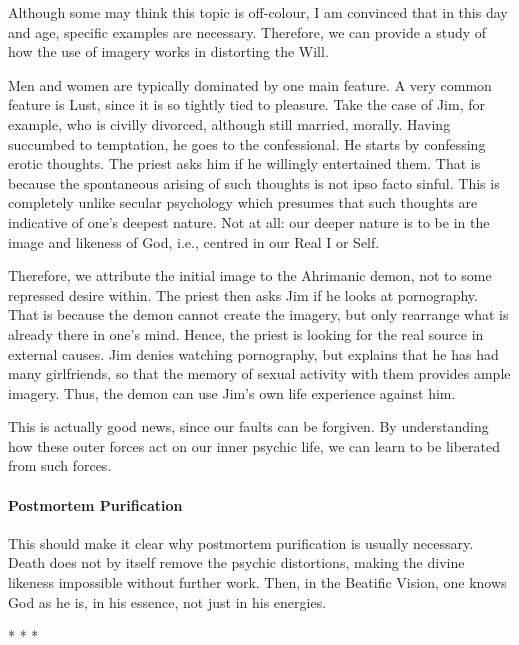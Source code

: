 Although some may think this topic is off-colour, I am convinced that in this day and age, specific examples are necessary. Therefore, we can provide a study of how the use of imagery works in distorting the Will.

Men and women are typically dominated by one main feature. A very common feature is Lust, since it is so tightly tied to pleasure. Take the case of Jim, for example, who is civilly divorced, although still married, morally. Having succumbed to temptation, he goes to the confessional. He starts by confessing erotic thoughts. The priest asks him if he willingly entertained them. That is because the spontaneous arising of such thoughts is not ipso facto sinful. This is completely unlike secular psychology which presumes that such thoughts are indicative of one's deepest nature. Not at all: our deeper nature is to be in the image and likeness of God, i.e., centred in our Real I or Self.

Therefore, we attribute the initial image to the Ahrimanic demon, not to some repressed desire within. The priest then asks Jim if he looks at pornography. That is because the demon cannot create the imagery, but only rearrange what is already there in one's mind. Hence, the priest is looking for the real source in external causes. Jim denies watching pornography, but explains that he has had many girlfriends, so that the memory of sexual activity with them provides ample imagery. Thus, the demon can use Jim's own life experience against him.

This is actually good news, since our faults can be forgiven. By understanding how these outer forces act on our inner psychic life, we can learn to be liberated from such forces.

\paragraph{Postmortem Purification}
This should make it clear why postmortem purification is usually necessary. Death does not by itself remove the psychic distortions, making the divine likeness impossible without further work. Then, in the Beatific Vision, one knows God as he is, in his essence, not just in his energies.




\begin{center}* * *\end{center}

